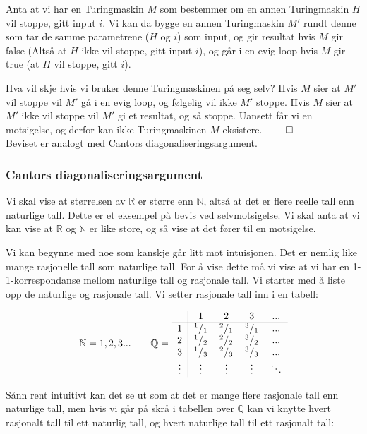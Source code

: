 Anta at vi har en Turingmaskin $ M $ som bestemmer om en annen Turingmaskin $ H $ vil stoppe, gitt input $ i $. Vi kan da bygge en annen Turingmaskin $ M' $ rundt denne som tar de samme parametrene ($ H $ og $ i $) som input, og gir resultat hvis $ M $ gir false (Altså at $ H $ ikke vil stoppe, gitt input $ i $), og går i en evig loop hvis $ M $ gir true (at $ H $ vil stoppe, gitt $ i $). 

Hva vil skje hvis vi bruker denne Turingmaskinen på seg selv? Hvis $ M $ sier at $ M' $ vil stoppe vil $ M' $ gå i en evig loop, og følgelig vil ikke $ M' $ stoppe. Hvis $ M $ sier at $ M' $ ikke vil stoppe vil $ M' $ gi et resultat, og så stoppe. Uansett får vi en motsigelse, og derfor kan ikke Turingmaskinen $ M $ eksistere. $ \hfill\qed $ \\

\noindent Beviset er analogt med Cantors diagonaliseringsargument.

\subsubsection{Cantors diagonaliseringsargument} \label{cantor}
Vi skal vise at størrelsen av $ \mathbb{R} $ er større enn $ \mathbb{N} $, altså at det er flere reelle tall enn naturlige tall. Dette er et eksempel på bevis ved selvmotsigelse. Vi skal anta at vi kan vise at $ \mathbb{R} $ og $ \mathbb{N} $ er like store, og så vise at det fører til en motsigelse.

Vi kan begynne med noe som kanskje går litt mot intuisjonen. Det er nemlig like mange rasjonelle tall som naturlige tall. For å vise dette må vi vise at vi har en 1-1-korrespondanse mellom naturlige tall og rasjonale tall. Vi starter med å liste opp  de naturlige og rasjonale tall. Vi setter rasjonale tall inn i en tabell:

\[ \mathbb{N} = 1, 2, 3 ... \quad\quad \mathbb{Q} = \begin{tabular}{c | c c c c}
  & 1 & 2 & 3 & ... \\
  \hline
1 & $ ^1/_1 $ & $ ^2/_1 $ & $ ^3/_1 $ & ... \\
2 & $ ^1/_2 $ & $ ^2/_2 $ & $ ^3/_2 $ & ... \\
3 & $ ^1/_3 $ & $ ^2/_3 $ & $ ^3/_3 $ & ... \\
\vdots & \vdots & \vdots & \vdots & $ \ddots $
\end{tabular} \]

Sånn rent intuitivt kan det se ut som at det er mange flere rasjonale tall enn naturlige tall, men hvis vi går på skrå i tabellen over $ \mathbb{Q} $ kan vi knytte hvert rasjonalt tall til ett naturlig tall, og hvert naturlige tall til ett rasjonalt tall:

